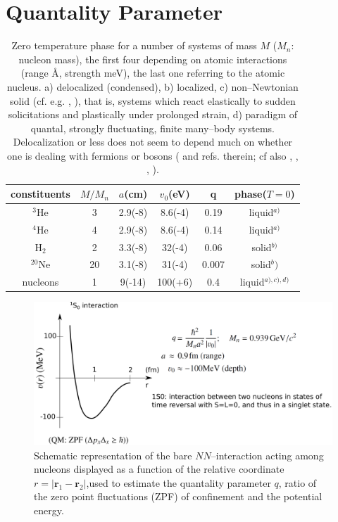 \section{Quantality Parameter}\label{App1A}
\begin{table}
 \begin{tabular}{|c|c|c|c|c|c|}
 \hline \rule[-2ex]{0pt}{5.5ex}   constituents& $M/M_n$  & $a$(cm) &$v_0$(eV)  &q&phase($T=0$)    \\ 
 \hline \rule[-2ex]{0pt}{5.5ex}   $^{3}$He &3& 2.9(-8)  &8.6(-4)  &0.19  &liquid$^{a)}$    \\ 
 \hline \rule[-2ex]{0pt}{5.5ex}  $^{4}$He  &4&  2.9(-8)&  8.6(-4)&  0.14& liquid$^{a)}$   \\ 
 \hline \rule[-2ex]{0pt}{5.5ex}    H$_2$&2&  3.3(-8)&  32(-4)&  0.06&solid$^{b)}$   \\ 
 \hline \rule[-2ex]{0pt}{5.5ex}    $^{20}$Ne&20& 3.1(-8) &  31(-4)&  0.007&solid$^b)$    \\ 
 \hline \rule[-2ex]{0pt}{5.5ex}    nucleons&1&  9(-14)& 100(+6) &  0.4&liquid$^{a),c),d)}$  \\ 
 \hline 
 \end{tabular}
 \caption{Zero temperature phase for a number of systems of mass $M$ ($M_n$: nucleon mass), the first four depending on atomic interactions (range \AA, strength meV), the last one referring to the atomic nucleus. a) delocalized (condensed), b) localized, c) non--Newtonian solid (cf. e.g. \cite{Bertsch:88b}, \cite{DeGennes:94}), that is, systems which react elastically to sudden solicitations and plastically under prolonged strain, d) paradigm of quantal, strongly fluctuating, finite many--body  systems. Delocalization or less does not seem to depend much on whether one is dealing with fermions or bosons (\cite{Mottelson:02} and refs. therein; cf also \cite{Ebran:14}, \cite{Ebran:14b}, \cite{Ebran:13}, \cite{Ebran:12}).}\label{tab1A1}
 \end{table}
 \begin{figure}
 \centerline{\includegraphics*[width=\textwidth,angle=0]{nutshell/figs/potential.pdf}}
 \caption{Schematic representation of the bare $NN$--interaction acting among nucleons displayed as a function of the relative coordinate $r=|\mathbf{r}_1-\mathbf{r}_2|$,used to estimate the quantality parameter $q$, ratio of the zero point fluctuations (ZPF) of confinement and the potential energy.}\label{fig1A1}
 \end{figure}
